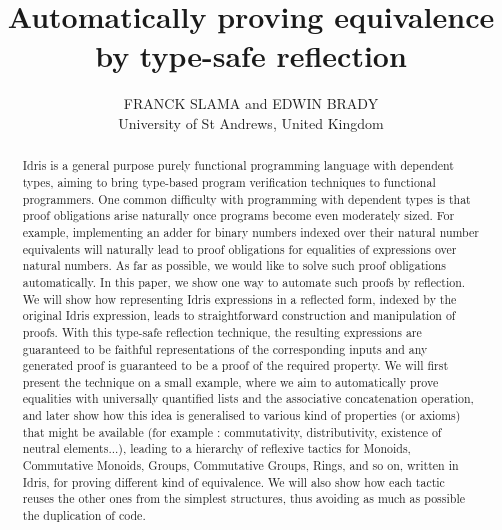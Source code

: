 \documentclass{jfp1}
\title[Automatically proving equivalence by type-safe reflection]
      {Automatically proving equivalence by type-safe reflection}
\author[Franck Slama and Edwin Brady]
        {FRANCK SLAMA and EDWIN BRADY\\
         University of St Andrews, United Kingdom\\
         \email{fs39@st-andrews.ac.uk, ecb10@st-andrews.ac.uk}}
\begin{document}
\label{firstpage}

\maketitle

\begin{abstract}
Idris is a general purpose purely functional programming language with dependent types, aiming to bring type-based program verification techniques to functional programmers. One common difficulty with programming with dependent types is that proof obligations arise naturally once programs become even moderately sized. For example, implementing an adder for binary numbers indexed over their natural number equivalents will naturally lead to proof obligations for equalities of expressions over natural numbers. 
As far as possible, we would like to solve such proof obligations automatically. In this paper, we show one way to automate such proofs by reflection. We will show how representing Idris expressions in a reflected form, indexed by the original Idris expression, leads to straightforward construction and manipulation of proofs.
With this type-safe reflection technique, the resulting expressions are guaranteed to be faithful representations of the corresponding inputs and any generated proof is guaranteed to be a proof of the required property. 
We will first present the technique on a small example, where we aim to automatically prove equalities with universally quantified lists and the associative concatenation operation, and later show how this idea is generalised to various kind of properties (or axioms) that might be available (for example : commutativity, distributivity, existence of neutral elements...), leading to a hierarchy of reflexive tactics for Monoids, Commutative Monoids, Groups, Commutative Groups, Rings, and so on, written in Idris, for proving different kind of equivalence. We will also show how each tactic reuses the other ones from the simplest structures, thus avoiding as much as possible the duplication of code.
\end{abstract}












\end{document}
